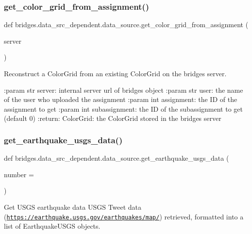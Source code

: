 \subsubsection{\texorpdfstring{get\+\_\+color\+\_\+grid\+\_\+from\+\_\+assignment()}{get\_color\_grid\_from\_assignment()}}
{\footnotesize\ttfamily def bridges.\+data\+\_\+src\+\_\+dependent.\+data\+\_\+source.\+get\+\_\+color\+\_\+grid\+\_\+from\+\_\+assignment (\begin{DoxyParamCaption}\item[{}]{server }\end{DoxyParamCaption})}



Reconstruct a Color\+Grid from an existing Color\+Grid on the bridges server. 

\+:param str server\+: internal server url of bridges object \+:param str user\+: the name of the user who uploaded the assignment \+:param int assignment\+: the ID of the assignment to get \+:param int subassignment\+: the ID of the subassignment to get (default 0) \+:return\+: Color\+Grid\+: the Color\+Grid stored in the bridges server \mbox{\label{namespacebridges_1_1data__src__dependent_1_1data__source_a0d2a8b28fa0fa79440112d02ca9cd7fc}} 
\subsubsection{\texorpdfstring{get\+\_\+earthquake\+\_\+usgs\+\_\+data()}{get\_earthquake\_usgs\_data()}}
{\footnotesize\ttfamily def bridges.\+data\+\_\+src\+\_\+dependent.\+data\+\_\+source.\+get\+\_\+earthquake\+\_\+usgs\+\_\+data (\begin{DoxyParamCaption}\item[{}]{number = {} }\end{DoxyParamCaption})}



Get U\+S\+GS earthquake data U\+S\+GS Tweet data (\href{https://earthquake.usgs.gov/earthquakes/map/}{\tt https\+://earthquake.\+usgs.\+gov/earthquakes/map/}) retrieved, formatted into a list of Earthquake\+U\+S\+GS objects. 


